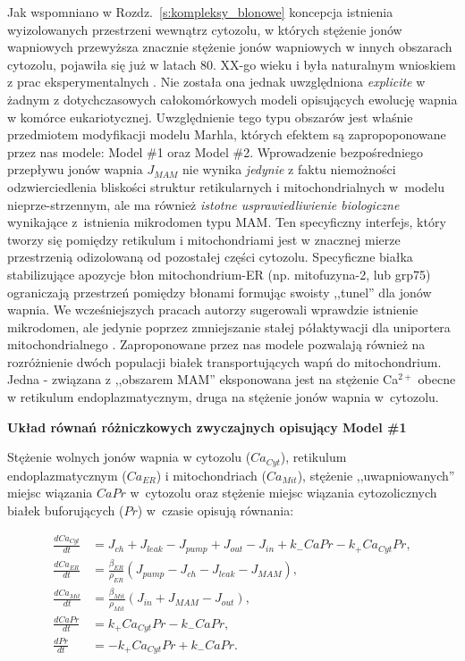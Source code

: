 Jak wspomniano w Rozdz.~\ref{s:kompleksy_blonowe} koncepcja istnienia wyizolowanych przestrzeni wewnątrz cytozolu, w których stężenie jonów wapniowych przewyższa znacznie stężenie jonów wapniowych w innych obszarach cytozolu, pojawiła się już w latach 80. XX-go wieku \cite{Rizzuto2006} i była naturalnym wnioskiem z prac eksperymentalnych \cite{Ashby2002,Bezzi1998,Petersen1995,Poenie1987}. Nie została ona jednak uwzględniona \textit{explicite} w żadnym z dotychczasowych całokomórkowych modeli opisujących ewolucję wapnia w komórce eukariotycznej. Uwzględnienie tego typu obszarów jest właśnie przedmiotem modyfikacji modelu Marhla, których efektem są zapropoponowane przez nas modele: Model \#1 oraz Model \#2. Wprowadzenie bezpośredniego przepływu jonów wapnia $J_{MAM}$ nie wynika \textit{jedynie} z faktu niemożności odzwierciedlenia bliskości struktur retikularnych i mitochondrialnych w~modelu nieprze-strzennym, ale ma również \textit{istotne usprawiedliwienie biologiczne} wynikające z~istnienia mikrodomen typu MAM. Ten specyficzny interfejs, który tworzy się pomiędzy retikulum i mitochondriami jest w znacznej mierze przestrzenią odizolowaną od pozostałej części cytozolu. Specyficzne białka stabilizujące apozycje błon mitochondrium-ER (np. mitofuzyna-2, lub grp75) ograniczają przestrzeń pomiędzy błonami formując swoisty ,,tunel'' dla jonów wapnia. We wcześniejszych pracach autorzy sugerowali wprawdzie istnienie mikrodomen, ale jedynie poprzez zmniejszanie stałej półaktywacji dla uniportera mitochondrialnego \cite{Marhl2000,Marhl1998}. Zaproponowane przez nas modele pozwalają również na rozróżnienie dwóch populacji białek transportujących wapń do mitochondrium. Jedna - związana z ,,obszarem MAM'' eksponowana jest na stężenie Ca$^{2+}$ obecne w retikulum endoplazmatycznym, druga na stężenie jonów wapnia w~cytozolu.


\par{\textbf{Układ równań różniczkowych zwyczajnych opisujący Model \#1}} 

Stężenie wolnych jonów wapnia w cytozolu ($Ca_{Cyt}$), retikulum endoplazmatycznym ($Ca_{ER}$) i mitochondriach ($Ca_{Mit}$), stężenie ,,uwapniowanych'' miejsc wiązania $CaPr$ w~cytozolu oraz stężenie miejsc wiązania cytozolicznych białek buforujących ($Pr$) w~czasie opisują równania:

\flushbottom

\begin{align}
\frac{dCa_{Cyt}}{dt}&=J_{ch}+J_{leak}-J_{pump}+J_{out}-J_{in} \label{eq:1} 
			+k_-CaPr-k_+Ca_{Cyt}Pr, \\
\frac{dCa_{ER}}{dt}&=\frac{\beta_{ER}}{\rho_{ER}}\left(J_{pump}-J_{ch}
			-J_{leak} -J_{MAM}\right), \label{eq:2}\\
\frac{dCa_{Mit}}{dt}&=\frac{\beta_{Mit}}{\rho_{Mit}}\left(J_{in}+J_{MAM}
			-J_{out}\right), \label{eq:3}\\
\frac{dCaPr}{dt}&= k_+ Ca_{Cyt}Pr - k_-CaPr, \label{eq:4}\\
\frac{dPr}{dt}&= -k_+ Ca_{Cyt}Pr + k_-CaPr. \label{eq:5}
\end{align}


